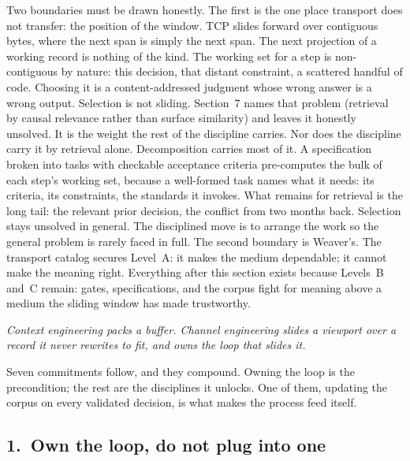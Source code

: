 \documentclass[11pt, a4paper]{article}
\newcommand{\pullquote}[1]{%
  \begin{pullquoteenv}%
    {\setstretch{1.35}\fontsize{11.5}{16}\itshape\color{indigo} #1}%
  \end{pullquoteenv}%
}
\begin{document}
Two boundaries must be drawn honestly. The first is the one place transport does not
transfer: the position of the window. TCP slides forward over contiguous bytes, where
the next span is simply the next span. The next projection of a working record is
nothing of the kind. The working set for a step is non-contiguous by nature: this
decision, that distant constraint, a scattered handful of code. Choosing it is a
content-addressed judgment whose wrong answer is a wrong output. Selection is not
sliding. Section~7 names that problem (retrieval by causal relevance rather than surface
similarity) and leaves it honestly unsolved. It is the weight the rest of the discipline
carries. Nor does the discipline carry it by retrieval alone. Decomposition carries most
of it. A specification broken into tasks with checkable acceptance criteria pre-computes
the bulk of each step's working set, because a well-formed task names what it needs: its
criteria, its constraints, the standards it invokes. What remains for retrieval is the
long tail: the relevant prior decision, the conflict from two months back. Selection
stays unsolved in general. The disciplined move is to arrange the work so the general
problem is rarely faced in full. The second boundary is Weaver's. The transport catalog secures Level~A: it
makes the medium dependable; it cannot make the meaning right. Everything after this
section exists because Levels~B and~C remain: gates, specifications, and the corpus
fight for meaning above a medium the sliding window has made trustworthy.

\pullquote{Context engineering packs a buffer. Channel engineering slides a viewport
over a record it never rewrites to fit, and owns the loop that slides it.}

Seven commitments follow, and they compound. Owning the loop is the precondition; the
rest are the disciplines it unlocks. One of them, updating the corpus on every validated
decision, is what makes the process feed itself.

\subsection*{1.~Own the loop, do not plug into one}
\end{document}
